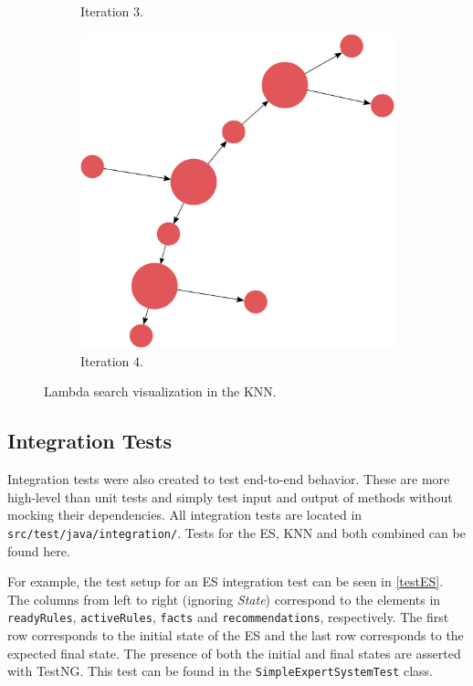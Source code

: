 \documentclass[titlepage,11pt]{article}
\newcommand{\code}[1]{\texttt{#1}}
\begin{document}
\begin{figure}[!htb]
\begin{subfigure}[!htb]{0.19\textwidth}
		\caption{Iteration 3.}
	\end{subfigure}
	\begin{subfigure}[!htb]{0.19\textwidth}
		\centering
		\includegraphics[width=\columnwidth]{figures/knn_simple_lambda_think_4.pdf}
		\caption{Iteration 4.}
	\end{subfigure}
	\caption{Lambda search visualization in the KNN.}
	\label{fig:lambda_search_test}
\end{figure}

\subsection{Integration Tests}
Integration tests were also created to test end-to-end behavior. These are more high-level than unit tests and simply test input and output of methods without mocking their dependencies. All integration tests are located in \code{src/test/java/integration/}. Tests for the ES, KNN and both combined can be found here.

For example, the test setup for an ES integration test can be seen in \autoref{testES}. The columns from left to right (ignoring \emph{State}) correspond to the elements in \code{readyRules}, \code{activeRules}, \code{facts} and \code{recommendations}, respectively. The first row corresponds to the initial state of the ES and the last row corresponds to the expected final state. The presence of both the initial and final states are asserted with TestNG. This test can be found in the \code{SimpleExpertSystemTest} class.
\end{document}

